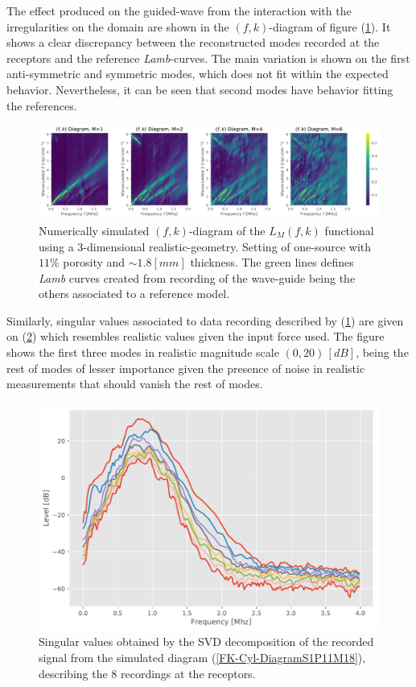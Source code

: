 The effect produced on the guided-wave from the interaction with the irregularities on the domain are shown in the $(f,k)$-diagram of figure (\ref{FK-HomBone-DiagramS1P11M18}). It shows a clear discrepancy between the reconstructed modes recorded at the receptors and the reference \textit{Lamb}-curves. The main variation is shown on the first anti-symmetric and symmetric modes, which does not fit within the expected behavior. Nevertheless, it can be seen that second modes have behavior fitting the references.  
\begin{figure}[!h]
	\centering
	\includegraphics[width=\textwidth]{images/ClusterSim/3DCorticalS1000TimeP11TransIsoFKW18.pdf}
	\caption{Numerically simulated $(f,k)$-diagram  of the $L_M(f,k)$ functional using a 3-dimensional realistic-geometry. Setting of one-source with $11\%$ porosity and $\sim 1.8 [mm]$ thickness. The green lines defines \textit{Lamb} curves created from recording of the wave-guide being the others associated to a reference model.}
	\label{FK-HomBone-DiagramS1P11M18}
\end{figure} 
Similarly, singular values associated to data recording described by (\ref{FK-HomBone-DiagramS1P11M18}) are given on (\ref{SVD-HomBone-S1P11M18}) which resembles realistic values given the input force used. The figure shows the first three modes in realistic magnitude scale $(0, 20) \, [dB]$, being the rest of modes of lesser importance given the presence of noise in realistic measurements that should vanish the rest of modes.
\begin{figure}[!h]  
	\centering
	\includegraphics[scale=.6]{images/ClusterSim/3DCorticalS1000TimeP11TransIsoFKW18_SV.pdf}
	\caption{Singular values obtained by the SVD decomposition of the recorded signal from the simulated diagram (\ref{FK-Cyl-DiagramS1P11M18}), describing the 8 recordings at the receptors.}
	\label{SVD-HomBone-S1P11M18}
\end{figure}
